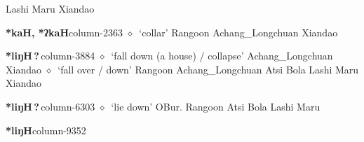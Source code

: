          Lashi 
\hspace{1ex}
         Maru 
\hspace{1ex}
         Xiandao 
  \item {\footnotesize \textbf{*kaH, *ʔkaH}}{\tiny column-2363}
         $\diamond$~`collar'
         Rangoon 
\hspace{1ex}
         Achang\_Longchuan 
\hspace{1ex}
         Xiandao 
  \item {\footnotesize \textbf{*liŋH\,?\,}}{\tiny column-3884}
         $\diamond$~`fall down (a house) / collapse'
         Achang\_Longchuan 
\hspace{1ex}
         Xiandao 
\hspace{1ex}
         $\diamond$~`fall over / down'
         Rangoon 
\hspace{1ex}
         Achang\_Longchuan 
\hspace{1ex}
         Atsi 
\hspace{1ex}
         Bola 
\hspace{1ex}
         Lashi 
\hspace{1ex}
         Maru 
\hspace{1ex}
         Xiandao 
  \item {\footnotesize \textbf{*liŋH\,?\,}}{\tiny column-6303}
         $\diamond$~`lie down'
         OBur. 
\hspace{1ex}
         Rangoon 
\hspace{1ex}
         Atsi 
\hspace{1ex}
         Bola 
\hspace{1ex}
         Lashi 
\hspace{1ex}
         Maru 
  \item {\footnotesize \textbf{*liŋH}}{\tiny column-9352}
